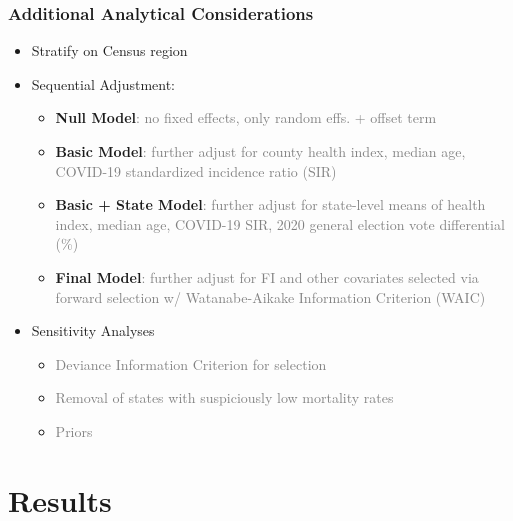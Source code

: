 \documentclass{beamer}
\begin{document}
	
    \begin{frame}
	\frametitle{Additional Analytical Considerations}
	\begin{itemize}
		\item Stratify on Census region
		\item Sequential Adjustment:
		\begin{itemize}
			\item \textbf{Null Model}\textcolor{gray}{: no fixed effects, only random effs. + offset term}
			\item \textbf{Basic Model}\textcolor{gray}{: further adjust for county health index, median age, COVID-19 standardized incidence ratio (SIR)}
			\item \textbf{Basic + State Model}\textcolor{gray}{: further adjust for state-level means of health index, median age, COVID-19 SIR, 2020 general election vote differential (\%)}
			\item \textbf{Final Model}\textcolor{gray}{: further adjust for FI and other covariates selected via forward selection w/ Watanabe-Aikake Information Criterion (WAIC)}
		\end{itemize}
		
		\item Sensitivity Analyses
		\begin{itemize}
			\item \textcolor{gray}{Deviance Information Criterion for selection}
			\item \textcolor{gray}{Removal of states with suspiciously low mortality rates}
			\item \textcolor{gray}{Priors}
		\end{itemize}
		
	\end{itemize}
\end{frame}



\section{Results}
\end{document}
